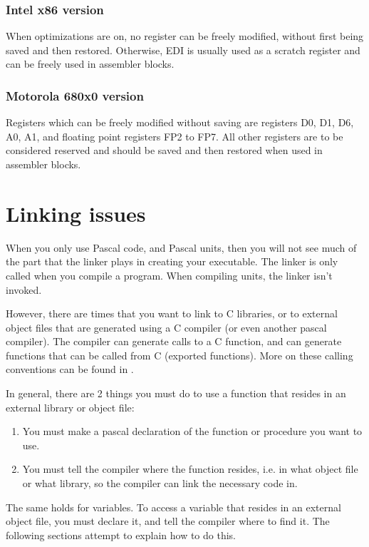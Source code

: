 \subsection{Intel x86 version}

When optimizations are on, no register can be freely modified, without
first being saved and then restored. Otherwise, EDI is usually used as
a scratch register and can be freely used in assembler blocks.

\subsection{Motorola 680x0 version}

Registers which can be freely modified without saving are registers
D0, D1, D6, A0, A1, and floating point registers FP2 to FP7. All other
registers are to be considered reserved and should be saved and then
restored when used in assembler blocks.

\chapter{Linking issues}
\label{ch:Linking}
When you only use Pascal code, and Pascal units, then you will not see much
of the part that the linker plays in creating your executable.
The linker is only called when you compile a program. When compiling units,
the linker isn't invoked.

However, there are times that you want to link to C libraries, or to external
object files that are generated using a C compiler (or even another pascal
compiler). The \fpc compiler can generate calls to a C function,
and can generate functions that can be called from C (exported functions).
More on these calling conventions can be found in .

In general, there are 2 things you must do to use a function that resides in
an external library or object file:
\begin{enumerate}
\item You must make a pascal declaration of the function or procedure you
want to use.
\item You must tell the compiler where the function resides, i.e. in what
object file or what library, so the compiler can link the necessary code in.
\end{enumerate}
The same holds for variables. To access a variable that resides in an
external object file, you must declare it, and tell the compiler where to
find it.
The following sections attempt to explain how to do this.


